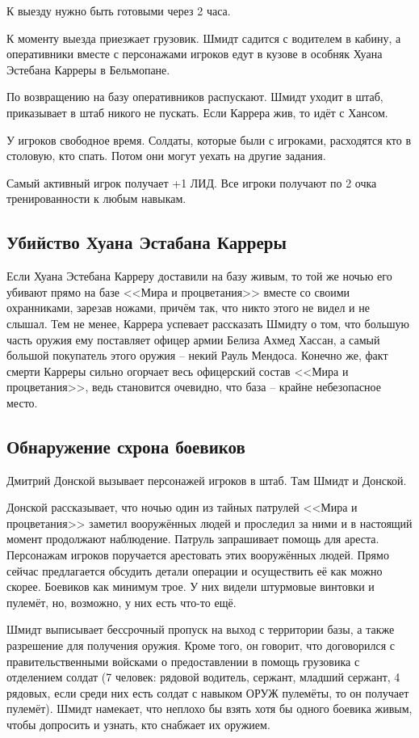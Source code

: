 \documentclass{article}
\begin{document}
К выезду нужно быть готовыми через 2 часа.

К моменту выезда приезжает грузовик. Шмидт садится с водителем в кабину,
а оперативники вместе с персонажами игроков едут в кузове в особняк
Хуана Эстебана Карреры в Бельмопане.

По возвращению на базу оперативников распускают. Шмидт уходит в штаб,
приказывает в штаб никого не пускать. Если Каррера жив, то идёт с
Хансом.

У игроков свободное время. Солдаты, которые были с игроками, расходятся
кто в столовую, кто спать. Потом они могут уехать на другие задания.

Самый активный игрок получает +1 ЛИД. Все игроки получают по 2 очка
тренированности к любым навыкам.

\subsection{Убийство Хуана Эстабана
Карреры}\label{carrera-murder}

Если Хуана Эстебана Карреру доставили на базу живым, то той же ночью его
убивают прямо на базе <<Мира и процветания>> вместе со своими охранниками,
зарезав ножами, причём так, что никто этого не видел и не слышал. Тем не
менее, Каррера успевает рассказать Шмидту о том, что большую часть
оружия ему поставляет офицер армии Белиза Ахмед Хассан, а самый большой
покупатель этого оружия -- некий Рауль Мендоса. Конечно же, факт смерти
Карреры сильно огорчает весь офицерский состав <<Мира и процветания>>,
ведь становится очевидно, что база -- крайне небезопасное место.

\subsection{Обнаружение схрона
боевиков}\label{hideout-discovery}

Дмитрий Донской вызывает персонажей игроков в штаб. Там Шмидт и Донской.

Донской рассказывает, что ночью один из тайных патрулей <<Мира и
процветания>> заметил вооружённых людей и проследил за ними и в настоящий
момент продолжают наблюдение. Патруль запрашивает помощь для ареста.
Персонажам игроков поручается арестовать этих вооружённых людей. Прямо
сейчас предлагается обсудить детали операции и осуществить её как можно
скорее. Боевиков как минимум трое. У них видели штурмовые винтовки и
пулемёт, но, возможно, у них есть что-то ещё.

Шмидт выписывает бессрочный пропуск на выход с территории базы, а также
разрешение для получения оружия. Кроме того, он говорит, что договорился
с правительственными войсками о предоставлении в помощь грузовика с
отделением солдат (7 человек: рядовой водитель, сержант, младший
сержант, 4 рядовых, если среди них есть солдат с навыком ОРУЖ пулемёты,
то он получает пулемёт). Шмидт намекает, что неплохо бы взять хотя бы
одного боевика живым, чтобы допросить и узнать, кто снабжает их оружием.
\end{document}
